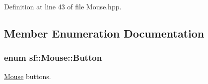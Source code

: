 Definition at line 43 of file Mouse.\-hpp.



\subsection{Member Enumeration Documentation}
\hypertarget{classsf_1_1_mouse_a4fb128be433f9aafe66bc0c605daaa90}{
\subsubsection[{Button}]{\setlength{\rightskip}{0pt plus 5cm}enum {\bf sf\-::\-Mouse\-::\-Button}}}\label{classsf_1_1_mouse_a4fb128be433f9aafe66bc0c605daaa90}


\hyperlink{classsf_1_1_mouse}{Mouse} buttons. 

